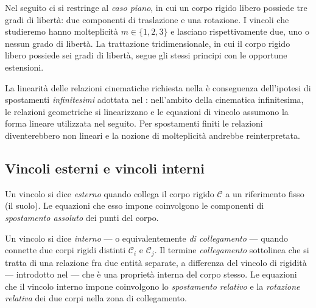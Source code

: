 Nel seguito ci si restringe al \emph{caso piano}, in cui un
corpo rigido libero possiede tre gradi di libertà: due
componenti di traslazione e una rotazione. I vincoli che
studieremo hanno molteplicità $m \in \{1,2,3\}$ e lasciano
rispettivamente due, uno o nessun grado di libertà. La
trattazione tridimensionale, in cui il corpo rigido libero
possiede sei gradi di libertà, segue gli stessi principi
con le opportune estensioni.


\begin{oss}
	La linearità delle relazioni cinematiche richiesta nella
	 è conseguenza dell'ipotesi di
	spostamenti \emph{infinitesimi} adottata nel
	: nell'ambito della
	cinematica infinitesima, le relazioni geometriche si
	linearizzano e le equazioni di vincolo assumono la forma
	lineare utilizzata nel seguito. Per spostamenti finiti
	le relazioni diventerebbero non lineari e la nozione di
	molteplicità andrebbe reinterpretata.
\end{oss}


\subsection{Vincoli esterni e vincoli interni}
\label{sec:esterno_interno}

\begin{definizione}\label{def:esterno}
	Un vincolo si dice \emph{esterno} quando collega il corpo rigido
	$\mathcal{C}$ a un riferimento fisso (il suolo). Le equazioni che
	esso impone coinvolgono le componenti di \emph{spostamento assoluto}
	dei punti del corpo.
\end{definizione}


\begin{definizione}\label{def:interno}
	Un vincolo si dice \emph{interno} --- o equivalentemente
	\emph{di collegamento} --- quando connette due corpi rigidi
	distinti $\mathcal{C}_i$ e $\mathcal{C}_j$. Il termine
	\emph{collegamento} sottolinea che si tratta di una relazione
	fra due entità separate, a differenza del vincolo di rigidità
	--- introdotto nel  --- che è una
	proprietà interna del corpo stesso. Le equazioni che il vincolo
	interno impone coinvolgono lo \emph{spostamento relativo} e la
	\emph{rotazione relativa} dei due corpi nella zona di
	collegamento.
\end{definizione}

